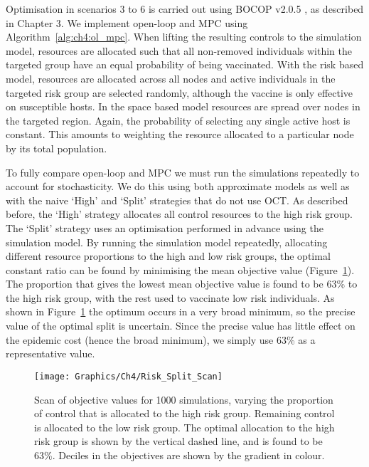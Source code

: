 Optimisation in scenarios 3 to 6 is carried out using BOCOP v2.0.5 \citep{bocop}, as described in Chapter 3. We implement open-loop and MPC using Algorithm~\ref{alg:ch4:ol_mpc}. When lifting the resulting controls to the simulation model, resources are allocated such that all non-removed individuals within the targeted group have an equal probability of being vaccinated. With the risk based model, resources are allocated across all nodes and active individuals in the targeted risk group are selected randomly, although the vaccine is only effective on susceptible hosts. In the space based model resources are spread over nodes in the targeted region. Again, the probability of selecting any single active host is constant. This amounts to weighting the resource allocated to a particular node by its total population.

To fully compare open-loop and MPC we must run the simulations repeatedly to account for stochasticity. We do this using both approximate models as well as with the naive `High' and `Split' strategies that do not use OCT. As described before, the `High' strategy allocates all control resources to the high risk group. The `Split' strategy uses an optimisation performed in advance using the simulation model. By running the simulation model repeatedly, allocating different resource proportions to the high and low risk groups, the optimal constant ratio can be found by minimising the mean objective value (Figure~\ref{fig:ch4:risk_split_scan}). The proportion that gives the lowest mean objective value is found to be 63\% to the high risk group, with the rest used to vaccinate low risk individuals. As shown in Figure~\ref{fig:ch4:risk_split_scan} the optimum occurs in a very broad minimum, so the precise value of the optimal split is uncertain. Since the precise value has little effect on the epidemic cost (hence the broad minimum), we simply use 63\% as a representative value.

\begin{figure}[t!]
    \begin{center}
        \texttt{[image: Graphics/Ch4/Risk\_Split\_Scan]}
        \caption[Optimisation of the Split strategy]{Scan of objective values for 1000 simulations, varying the proportion of control that is allocated to the high risk group. Remaining control is allocated to the low risk group. The optimal allocation to the high risk group is shown by the vertical dashed line, and is found to be 63\%. Deciles in the objectives are shown by the gradient in colour.}
        \label{fig:ch4:risk_split_scan}
    \end{center}
\end{figure}


